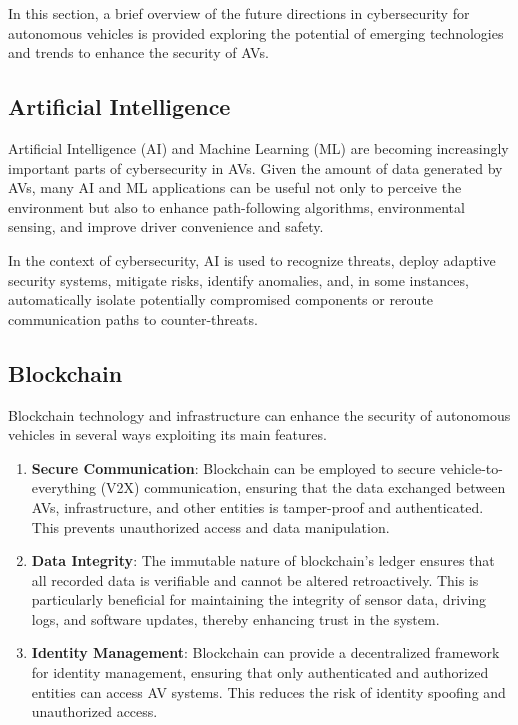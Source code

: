 In this section, a brief overview of the future directions in cybersecurity for autonomous vehicles is provided
exploring the potential of emerging technologies and trends to enhance the security of AVs.

\subsection{Artificial Intelligence}\label{subsec:artificial-intelligence}
Artificial Intelligence (AI) and Machine Learning (ML)
are becoming increasingly important parts of cybersecurity in AVs.
Given the amount of data generated by AVs,
many AI and ML applications can be useful not only to perceive the environment
but also to enhance path-following algorithms, environmental sensing,
and improve driver convenience and safety\cite{giannaros2023autonomous}.

In the context of cybersecurity, AI is used to recognize threats,
deploy adaptive security systems, mitigate risks, identify anomalies,
and, in some instances,
automatically isolate potentially compromised components
or reroute communication paths to counter-threats\cite{durlik2022cybersecurity}.

\subsection{Blockchain}\label{subsec:blockchain}

Blockchain technology and infrastructure can enhance the security of autonomous vehicles in several ways exploiting its main features.

\begin{enumerate}
    \item \textbf{Secure Communication}: Blockchain can be employed to secure vehicle-to-everything (V2X) communication,
    ensuring that the data exchanged between AVs, infrastructure, and other entities is tamper-proof and authenticated.
    This prevents unauthorized access and data manipulation.
    \item \textbf{Data Integrity}: The immutable nature of blockchain’s ledger ensures that all recorded data is verifiable
    and cannot be altered retroactively.
    This is particularly beneficial for maintaining the integrity of sensor data, driving logs, and software updates,
    thereby enhancing trust in the system.
    \item \textbf{Identity Management}: Blockchain can provide a decentralized framework for identity management,
    ensuring that only authenticated and authorized entities can access AV systems.
    This reduces the risk of identity spoofing and unauthorized access.
\end{enumerate}

